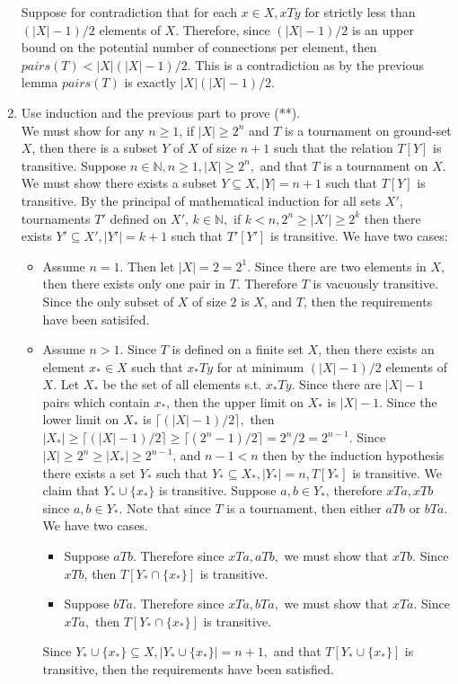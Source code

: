 \documentclass[12pt, letterpaper]{article}
\newcommand{\N}{\mathbb{N}}
\begin{document}
\begin{enumerate}
Suppose for contradiction that for each $x\in X, xTy$ for strictly less than $(|X| - 1)/2$ elements of $X$.  Therefore, since $(|X| - 1)/2$ is an upper bound on the potential number of connections per element, then $pairs(T) < |X|(|X| - 1)/2$.  This is a contradiction as by the previous lemma $pairs(T)$ is exactly $|X|(|X| - 1)/2$.
\item Use induction and the previous part to prove (**).\\

We must show for any $n \geq 1$, if $|X| \geq 2^n$ and $T$ is a tournament on ground-set $X$, then there is a subset $Y$ of $X$ of size $n+1$ such that the relation $T[Y]$ is transitive.  Suppose $n \in \N, n \geq 1, |X| \geq 2^n,$ and that $T$ is a tournament on $X$.  We must show there exists a subset $Y \subseteq X, |Y| = n+1$ such that $T[Y]$ is transitive.  By the principal of mathematical induction for all sets $X'$, tournaments $T'$ defined on $X'$, $k \in \N,$ if $k < n, 2^n \geq |X'| \geq 2^k$  then there exists $Y' \subseteq X', |Y'| = k+1$ such that $T'[Y']$ is transitive.  We have two cases:
\begin{itemize}
	\item Assume $n=1$.  Then let $|X| = 2 = 2^1.$  Since there are two elements in $X$, then there exists only one pair in $T$.  Therefore $T$ is vacuously transitive.  Since the only subset of $X$ of size $2$ is $X$, and $T$, then the requirements have been satisifed.
	\item Assume $n > 1.$  Since $T$ is defined on a finite set $X$, then there exists an element $x_* \in X$ such that $x_*Ty$ for at minimum $(|X|-1)/2$ elements of $X$.  Let $X_*$ be the set of all elements s.t. $x_* T y$.  Since there are $|X| - 1$ pairs which contain $x_*$, then the upper limit on $X_*$ is $|X| - 1$.  Since the lower limit on $X_*$ is $\lceil (|X|-1)/2 \rceil,$ then $|X_*| \geq \lceil (|X|-1)/2 \rceil \geq \lceil (2^n-1)/2 \rceil = 2^n/2 = 2^{n-1}.$  Since $|X| \geq 2^n \geq |X_*| \geq 2^{n-1}$, and $n-1 < n$ then by the induction hypothesis there exists a set $Y_*$ such that $Y_* \subseteq X_*, |Y_*| = n, T[Y_*]$ is transitive.  We claim that $Y_* \cup \{x_*\}$ is transitive.  Suppose $a,b\in Y_*$, therefore $xTa, xTb$ since   $a,b\in Y_*$.  Note that since $T$ is a tournament, then either $aTb$ or $bTa.$  We have two cases.
	\begin{itemize}
		\item Suppose $aTb$.  Therefore since $xTa, aTb,$ we must show that $xTb.$  Since $xTb$, then $T[Y_* \cap \{x_*\}]$ is transitive.
		\item Suppose $bTa$.  Therefore since $xTa, bTa,$ we must show that $xTa.$  Since $xTa,$ then $T[Y_* \cap \{x_*\}]$ is transitive.
	\end{itemize}
	Since $Y_*\cup \{x_*\}\subseteq X, |Y_*\cup \{x_*\}| = n+1,$ and that $T[Y_*\cup \{x_*\}]$ is transitive, then the requirements have been satisfied.  
\end{itemize}
\end{enumerate}
\end{document}
